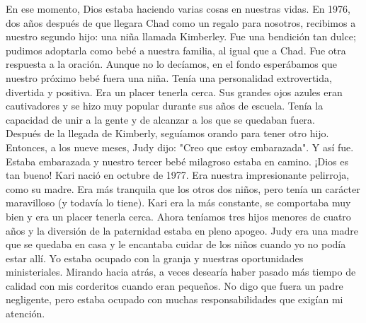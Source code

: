 \documentclass[twoside, 12pt]{book}
\begin{document}
En ese momento, Dios estaba haciendo varias cosas en nuestras vidas. En 1976, dos años después de que llegara Chad como un regalo para nosotros, recibimos a nuestro segundo hijo: una niña llamada Kimberley. Fue una bendición tan dulce; pudimos adoptarla como bebé a nuestra familia, al igual que a Chad. Fue otra respuesta a la oración. Aunque no lo decíamos, en el fondo esperábamos que nuestro próximo bebé fuera una niña. Tenía una personalidad extrovertida, divertida y positiva. Era un placer tenerla cerca. Sus grandes ojos azules eran cautivadores y se hizo muy popular durante sus años de escuela. Tenía la capacidad de unir a la gente y de alcanzar a los que se quedaban fuera.\\

Después de la llegada de Kimberly, seguíamos orando para tener otro hijo. Entonces, a los nueve meses, Judy dijo: "Creo que estoy embarazada". Y así fue. Estaba embarazada y nuestro tercer bebé milagroso estaba en camino. ¡Dios es tan bueno! Kari nació en octubre de 1977. Era nuestra impresionante pelirroja, como su madre. Era más tranquila que los otros dos niños, pero tenía un carácter maravilloso (y todavía lo tiene). Kari era la más constante, se comportaba muy bien y era un placer tenerla cerca. Ahora teníamos tres hijos menores de cuatro años y la diversión de la paternidad estaba en pleno apogeo. Judy era una madre que se quedaba en casa y le encantaba cuidar de los niños cuando yo no podía estar allí. Yo estaba ocupado con la granja y nuestras oportunidades ministeriales. Mirando hacia atrás, a veces desearía haber pasado más tiempo de calidad con mis corderitos cuando eran pequeños. No digo que fuera un padre negligente, pero estaba ocupado con muchas responsabilidades que exigían mi atención.\\
\end{document}
